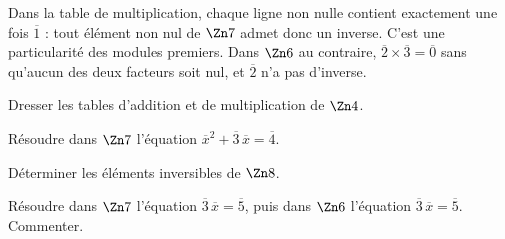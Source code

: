 \begin{exemple}
Dans la table de multiplication, chaque ligne non nulle contient exactement une
fois $\overline1$ : tout élément non nul de $\Zn 7$ admet donc un inverse.
C'est une particularité des modules premiers. Dans $\Zn 6$ au contraire,
$\overline2 \times \overline3 = \overline0$ sans qu'aucun des deux facteurs
soit nul, et $\overline2$ n'a pas d'inverse.
\end{exemple}

\begin{entrainement}
\exo[\niveau{1}] Dresser les tables d'addition et de multiplication de
$\Zn 4$.

\exo[\niveau{2}] Résoudre dans $\Zn 7$ l'équation
$\overline x^{2}+\overline3\,\overline x = \overline4$.

\exo[\niveau{2}] Déterminer les éléments inversibles de $\Zn 8$.

\exo[\niveau{3}] Résoudre dans $\Zn 7$ l'équation
$\overline3\,\overline x = \overline5$, puis dans $\Zn 6$ l'équation
$\overline3\,\overline x = \overline5$. Commenter.
\end{entrainement}


